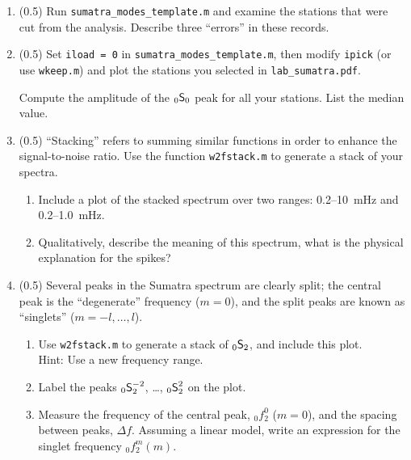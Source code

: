 \documentclass[11pt,titlepage,fleqn]{article}
\newcommand{\snl}[2]{\mbox{$_{#1}\ssS_{#2}$}}
\newcommand{\snlm}[3]{\mbox{$_{#1}\ssS_{#2}^{#3}$}}
\begin{document}
\begin{enumerate}

\item (0.5) Run \verb+sumatra_modes_template.m+ and examine the stations that were cut from the analysis. Describe three ``errors'' in these records.


\item (0.5) Set \verb+iload = 0+ in \verb+sumatra_modes_template.m+, then modify \verb+ipick+ (or use \verb+wkeep.m+) and plot the stations you selected in \verb+lab_sumatra.pdf+.

Compute the amplitude of the \snl{0}{0} peak for all your stations. List the median value.


\item (0.5) ``Stacking'' refers to summing similar functions in order to enhance the signal-to-noise ratio. Use the function \verb+w2fstack.m+ to generate a stack of your spectra.
%
\begin{enumerate}
\item Include a plot of the stacked spectrum over two ranges: 0.2--10~mHz and 0.2--1.0~mHz.
\item Qualitatively, describe the meaning of this spectrum, \eg what is the physical explanation for the spikes?
\end{enumerate}
%


\item (0.5) Several peaks in the Sumatra spectrum are clearly split; the central peak is the ``degenerate'' frequency ($m=0$), and the split peaks are known as ``singlets'' ($m = -l,\ldots,l$). 
%
\begin{enumerate}
\item Use \verb+w2fstack.m+ to generate a stack of \snl{0}{2}, and include this plot. \\
Hint: Use a new frequency range.
\item Label the peaks \snlm{0}{2}{-2}, \ldots, \snlm{0}{2}{2} on the plot.
\item Measure the frequency of the central peak, $_0f_2^0$ ($m=0$), and the spacing between peaks, $\Delta f$.
Assuming a linear model, write an expression for the singlet frequency $_0f_2^m(m)$.
\end{enumerate}



\end{enumerate}
\end{document}
